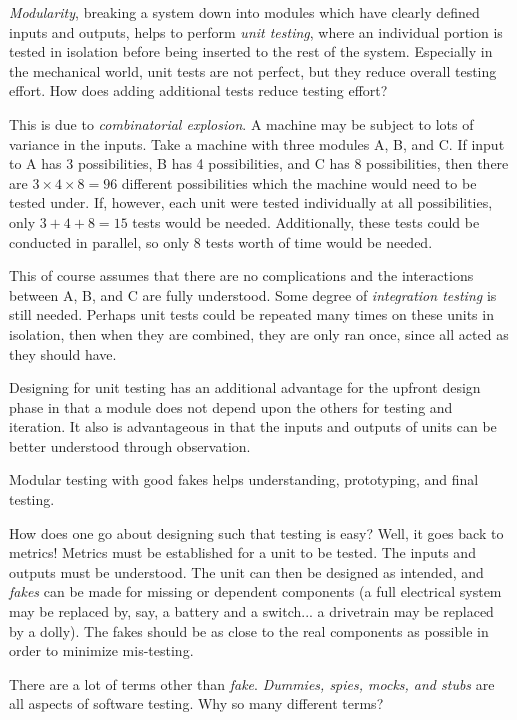 \textit{Modularity}, breaking a system down into modules which have clearly defined inputs and outputs, helps to perform \textit{unit testing}, where an individual portion is tested in isolation before being inserted to the rest of the system. Especially in the mechanical world, unit tests are not perfect, but they reduce overall testing effort. How does adding additional tests reduce testing effort?

This is due to \textit{combinatorial explosion}. A machine may be subject to lots of variance in the inputs. Take a machine with three modules A, B, and C. If input to A has 3 possibilities, B has 4 possibilities, and C has 8 possibilities, then there are $3 \times 4 \times 8 = 96$ different possibilities which the machine would need to be tested under. If, however, each unit were tested individually at all possibilities, only $3 + 4 + 8 = 15$ tests would be needed. Additionally, these tests could be conducted in parallel, so only 8 tests worth of time would be needed.

This of course assumes that there are no complications and the interactions between A, B, and C are fully understood. Some degree of \textit{integration testing} is still needed. Perhaps unit tests could be repeated many times on these units in isolation, then when they are combined, they are only ran once, since all acted as they should have.

Designing for unit testing has an additional advantage for the upfront design phase in that a module does not depend upon the others for testing and iteration. It also is advantageous in that the inputs and outputs of units can be better understood through observation.

\begin{theorem}
	Modular testing with good fakes helps understanding, prototyping, and final testing.
\end{theorem}

How does one go about designing such that testing is easy? Well, it goes back to metrics! Metrics must be established for a unit to be tested. The inputs and outputs must be understood. The unit can then be designed as intended, and \textit{fakes} can be made for missing or dependent components (a full electrical system may be replaced by, say, a battery and a switch... a drivetrain may be replaced by a dolly). The fakes should be as close to the real components as possible in order to minimize mis-testing.

\addvspace{2.0ex}
\begin{qbox}
	There are a lot of terms other than \textit{fake}. \textit{Dummies, spies, mocks, and stubs} are all aspects of software testing. Why so many different terms?
\end{qbox}

